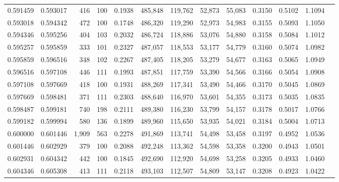\begin{tabular}{rrrrrrrrrrrrr}
0.591459 & 0.593017 &   416 & 100 &                                     0.1938 & 485,848 & 119,762 &  52,873 &  55,083 & 0.3150 & 0.5102 & 1.1094 \\
0.593018 & 0.594342 &   472 & 100 &                                     0.1748 & 486,320 & 119,290 &  52,973 &  54,983 & 0.3155 & 0.5093 & 1.1050 \\
0.594346 & 0.595256 &   404 & 103 &                                     0.2032 & 486,724 & 118,886 &  53,076 &  54,880 & 0.3158 & 0.5084 & 1.1012 \\
0.595257 & 0.595859 &   333 & 101 &                                     0.2327 & 487,057 & 118,553 &  53,177 &  54,779 & 0.3160 & 0.5074 & 1.0982 \\
0.595859 & 0.596516 &   348 & 102 &                                     0.2267 & 487,405 & 118,205 &  53,279 &  54,677 & 0.3163 & 0.5065 & 1.0949 \\
0.596516 & 0.597108 &   446 & 111 &                                     0.1993 & 487,851 & 117,759 &  53,390 &  54,566 & 0.3166 & 0.5054 & 1.0908 \\
0.597108 & 0.597669 &   418 & 100 &                                     0.1931 & 488,269 & 117,341 &  53,490 &  54,466 & 0.3170 & 0.5045 & 1.0869 \\
0.597669 & 0.598481 &   371 & 111 &                                     0.2303 & 488,640 & 116,970 &  53,601 &  54,355 & 0.3173 & 0.5035 & 1.0835 \\
0.598487 & 0.599181 &   740 & 198 &                                     0.2111 & 489,380 & 116,230 &  53,799 &  54,157 & 0.3178 & 0.5017 & 1.0766 \\
0.599182 & 0.599994 &   580 & 136 &                                     0.1899 & 489,960 & 115,650 &  53,935 &  54,021 & 0.3184 & 0.5004 & 1.0713 \\
0.600000 & 0.601446 & 1,909 & 563 &                                     0.2278 & 491,869 & 113,741 &  54,498 &  53,458 & 0.3197 & 0.4952 & 1.0536 \\
0.601446 & 0.602929 &   379 & 100 &                                     0.2088 & 492,248 & 113,362 &  54,598 &  53,358 & 0.3200 & 0.4943 & 1.0501 \\
0.602931 & 0.604342 &   442 & 100 &                                     0.1845 & 492,690 & 112,920 &  54,698 &  53,258 & 0.3205 & 0.4933 & 1.0460 \\
0.604346 & 0.605308 &   413 & 111 &                                     0.2118 & 493,103 & 112,507 &  54,809 &  53,147 & 0.3208 & 0.4923 & 1.0422 \\

\end{tabular}
